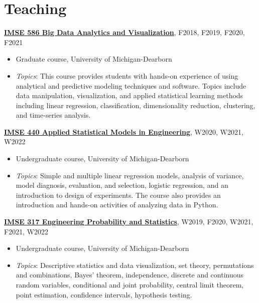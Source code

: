 \documentclass[11pt]{article}
\newenvironment{main}
{\begin{adjustwidth}{3em}{}}
{\end{adjustwidth}}
\begin{document}
\section*{Teaching}
\begin{main}

\textbf{\href{https://imse586.github.io/}{IMSE 586 Big Data Analytics and Visualization}}, F2018, F2019, F2020, F2021

\begin{itemize}
    \item[] Graduate course, University of Michigan-Dearborn 
    \item[] \textit{Topics}: This course provides students with hands-on experience of using analytical and predictive modeling techniques and software. Topics include data manipulation, visualization, and applied statistical learning methods including linear regression, classification, dimensionality reduction, clustering, and time-series analysis. 
\end{itemize}


\textbf{\href{https://imse440.github.io/}{IMSE 440 Applied Statistical Models in Engineering}}, W2020, W2021, W2022

\begin{itemize}
    \item[] Undergraduate course, University of Michigan-Dearborn
    \item[] \textit{Topics}: Simple and multiple linear regression models, analysis of variance, model diagnosis, evaluation, and selection, logistic regression, and an introduction to design of experiments. The course also provides an introduction and hands-on activities of analyzing data in Python.
\end{itemize}


\textbf{\href{https://imse317.github.io/}{IMSE 317 Engineering Probability and Statistics}}, W2019, F2020, W2021, F2021, W2022

\begin{itemize}
    \item[] Undergraduate course, University of Michigan-Dearborn
    \item[] \textit{Topics}: Descriptive statistics and data visualization, set theory, permutations and combinations, Bayes’ theorem, independence, discrete and continuous random variables, conditional and joint probability, central limit theorem, point estimation, confidence intervals, hypothesis testing. 
\end{itemize}



\end{main}
\end{document}
